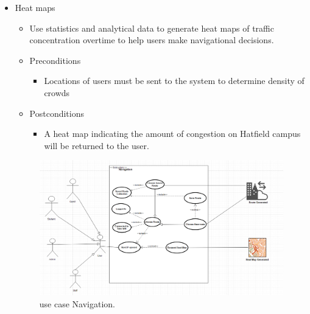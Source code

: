 \documentclass[12pt]{article}
\begin{document}
\begin{enumerate}
\begin{itemize}
				\item Heat maps
				\begin{itemize}
					\item Use statistics and analytical data to generate heat maps of traffic concentration overtime to help users make navigational decisions.
					\item Preconditions
					\begin{itemize}
						\item Locations of users must be sent to the system to determine density of crowds
					\end{itemize}
					\item Postconditions
					\begin{itemize}
						\item A heat map indicating the amount of congestion on Hatfield campus will be returned to the user.
					\end{itemize}
				\end{itemize}
				\begin{figure}
				    \includegraphics[width=\linewidth]{useCaseNavigation.png}
				    \caption{use case Navigation.}
  \label{fig:Navigation}
				\end{figure}
			\end{itemize}	
			

\end{enumerate}
\end{document}
